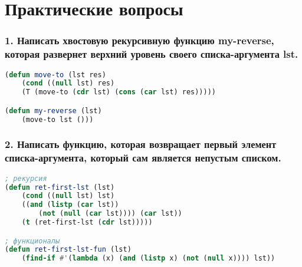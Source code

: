 \section*{Практические вопросы}


\subsubsection*{1. Написать хвостовую рекурсивную функцию my-reverse, которая развернет верхний	уровень своего списка-аргумента lst.}
\begin{lstlisting}[language=Lisp]
(defun move-to (lst res)
	(cond ((null lst) res)
	(T (move-to (cdr lst) (cons (car lst) res)))))

(defun my-reverse (lst)
	(move-to lst ()))
\end{lstlisting}


\subsubsection*{2. Написать функцию, которая возвращает первый элемент списка-аргумента, который сам является непустым списком.}

\begin{lstlisting}[language=Lisp]
; рекурсия
(defun ret-first-lst (lst)
	(cond ((null lst) lst)
	((and (listp (car lst)) 
		(not (null (car lst)))) (car lst))
	(t (ret-first-lst (cdr lst)))))

; функционалы
(defun ret-first-lst-fun (lst)
	(find-if #'(lambda (x) (and (listp x) (not (null x)))) lst))
\end{lstlisting}


